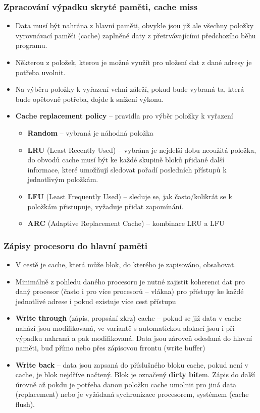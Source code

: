 \documentclass{beamer}
\begin{document}
\begin{frame}
\frametitle{Zpracování výpadku skryté paměti, cache miss}

\begin{itemize}
\item Data musí být nahrána z hlavní paměti, obvykle jsou již ale všechny položky vyrovnávací paměťi (cache) zaplněné daty z přetrvávajícími předchozího běhu programu.
\item Některou z položek, kterou je možné využít pro uložení dat z dané adresy je potřeba uvolnit.
\item Na výběru položky k vyřazení velmi záleží, pokud bude vybraná ta, která bude opětovně potřeba, dojde k snížení výkonu.
\item \textbf{Cache replacement policy} -- pravidla pro výběr položky k vyřazení
\begin{itemize}
\item \textbf{Random} -- vybraná je náhodná položka
\item \textbf{LRU} (Least Recently Used) -- vybrána je nejdelší dobu neoužitá položka, do obvodů cache musí být ke každé skupině bloků přidané další informace, které umožňují sledovat pořadí posledních přístupů k jednotlivým položkám.
\item \textbf{LFU} (Least Frequently Used) -- sleduje se, jak často/kolikrát se k položkám přistupuje, vyžaduje přidat zapomínání.
\item \textbf{ARC} (Adaptive Replacement Cache) – kombinace LRU a LFU
\end{itemize}
\end{itemize}

\end{frame}

\begin{frame}
\frametitle{Zápisy procesoru do hlavní paměti}

\begin{itemize}
\item V cestě je cache, která může blok, do kterého je zapisováno, obsahovat.
\item Minimálně z pohledu daného procesoru je nutné zajistit koherenci dat pro daný procesor (často i pro více procesorů -- vlákna) pro přístupy ke každé jednotlivé adrese i pokud existuje více cest přístupu 
\item \textbf{Write through} (zápis, propsání zkrz) cache -- pokud se již data v cache nahází jsou modifikovaná, ve variantě s automatickou alokací jsou i při výpadku nahraná a pak modifikovaná. Data jsou zároveň odeslaná do hlavní paměti, buď přímo nebo přes zápisovou frrontu (write buffer)
\item \textbf{Write back} -- data jsou zapsaná do příslušného bloku cache, pokud není v cache, je blok nejdříve načtený. Blok je označený \textbf{dirty bit}em. Zápis do další úrovně až pokdu je potřeba danou položku cache umolnit pro jiná data (replacement) nebo je vyžádaná sychronizace procesorem, systémem (cache flush).
\end{itemize}

\end{frame}
\end{document}
